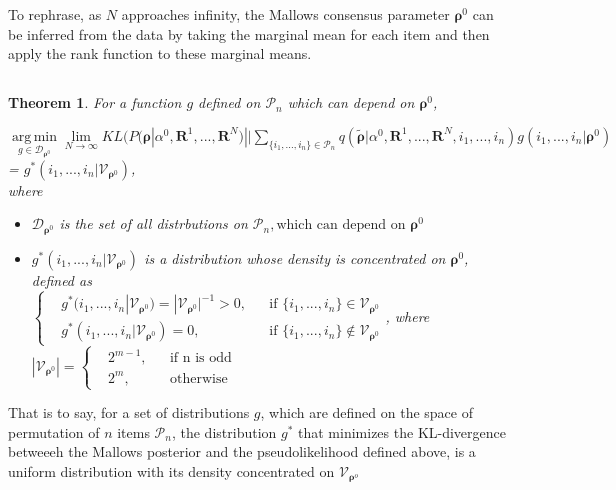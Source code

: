 \documentclass[11pt, oneside]{article}   	%
\newtheorem{theorem}{Theorem}[subsection]
\begin{document}
To rephrase, as $N$ approaches infinity, the Mallows consensus parameter $\bm{\rho}^0$ can be inferred from the data by taking the marginal mean for each item and then apply the rank function to these marginal means.
\subsection{ }
\begin{theorem}
	For a function $g$ defined on $\mathcal{P}_n$ which can depend on $\bm{\rho}^0$, 

 $\operatorname*{arg\,min}\limits_{g\in\mathcal{D}_{\bm{\rho}^0}}\lim\limits_{N \rightarrow \infty} KL (P(\bm{\rho}|\alpha^0, \bm{R}^1, ...,\bm{R}^N ) || \sum\limits_{\{i_1,..., i_n\} \in \mathcal{P}_n} q (\tilde{\bm{\rho}}|\alpha^0, \bm{R}^1,..., \bm{R}^N, i_1,...,i_n) g(i_1,...,i_n|\bm{\rho}^0)$ \\
= $g^*(i_1,...,i_n|\mathcal{V}_{{\bm{\rho}}^0})$, \\ 
where 
\begin{itemize}
	\item{
		$\mathcal{D}_{\bm{\rho}^0}$ is the set of all distrbutions on $\mathcal{P}_n, \text{which can depend on } \bm{\rho}^0$ 
	}
	\item{
		$g^*(i_1, ..., i_n | \mathcal{V}_{\bm{\rho}^0})$ is a distribution whose density is concentrated on $\bm{\rho}^0$, defined as \\
		  $
		\left \{
		\begin{aligned}
		&g^*(i_1, ..., i_n | \mathcal{V}_{\bm{\rho}^0}) = |\mathcal{V}_{\bm{\rho}^0}|^{-1}>0 , && \text{if } \{i_1,...,i_n\}\in \mathcal{V}_{\bm{\rho}^0}\\
		&g^*(i_1, ..., i_n | \mathcal{V}_{\bm{\rho}^0}) = 0 , && \text{if } \{i_1,...,i_n\}\notin \mathcal{V}_{\bm{\rho}^0}
		\end{aligned} \right.
		$, where $|\mathcal{V}_{\bm{\rho}^0}|
			= \left \{
			\begin{aligned}
			&2^{m-1}, && \text{if n is odd} \\
			&2^m, && \text{otherwise}
			\end{aligned} \right.
			$
	}

\end{itemize}

\end{theorem}
That is to say, for a set of distributions $g$, which are defined on the space of permutation of $n$ items $\mathcal{P}_n$, the distribution $g^*$ that minimizes the KL-divergence betweeeh the Mallows posterior and the pseudolikelihood defined above, is a uniform distribution with its density concentrated on $\mathcal{V}_{\bm{\rho}^o}$
\end{document}
